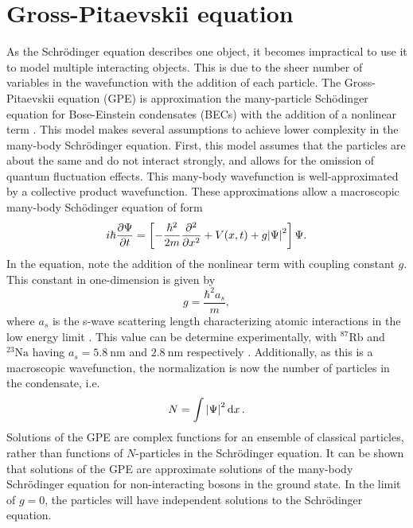 \section{Gross-Pitaevskii equation}
As the Schr\"odinger equation describes one object, it becomes impractical to use it to model multiple interacting objects. This is due to the sheer number of variables in the wavefunction with the addition of each particle. The Gross-Pitaevskii equation (GPE) is approximation the many-particle Sch\"odinger equation for Bose-Einstein condensates (BECs) with the addition of a nonlinear term \cite{Barenghi_2016}. 
This model makes several assumptions to achieve lower complexity in the many-body Schr\"odinger equation.
First, this model assumes that the particles are about the same and do not interact strongly, and allows for the omission of quantum fluctuation effects. This many-body wavefunction is well-approximated by a collective product wavefunction.  These approximations allow a macroscopic many-body Sch\"odinger equation of form \begin{equation}
	i \hbar \pdv{\Psi}{t} = \left[ -\frac{\hbar^2}{2m} \pdv[2]{x} + V(x, t) + g \abs{\Psi}^2 \right] \Psi.  \label{eq:gpe}
\end{equation}
In the equation, note the addition of the nonlinear term with coupling constant $g$. This constant in one-dimension is given by \begin{equation}
	g = \frac{\hbar^2 a_s}{m},
\end{equation}
where $a_s$ is the s-wave scattering length characterizing atomic interactions in the low energy limit \cite{pethick2002bose}. This value can be determine experimentally, with $^{87}\text{Rb}$ and $^{23}\text{Na}$ having $a_s = \SI{5.8}{\nm}$ and $\SI{2.8}{\nm}$ respectively \cite{Barenghi_2016}. Additionally, as this is a macroscopic wavefunction, the normalization is now the number of particles in the condensate, i.e. \begin{equation}
	N = \int \abs{ \Psi }^2 \dd{x}.
\end{equation}
Solutions of the GPE are complex functions for an ensemble of classical particles, rather than functions of $N$-particles in the Schr\"odinger equation. It can be shown that solutions of the GPE are approximate solutions of the many-body Schr\"odinger equation for non-interacting bosons in the ground state. In the limit of $g=0$, the particles will have independent solutions to the Schr\"odinger equation.

